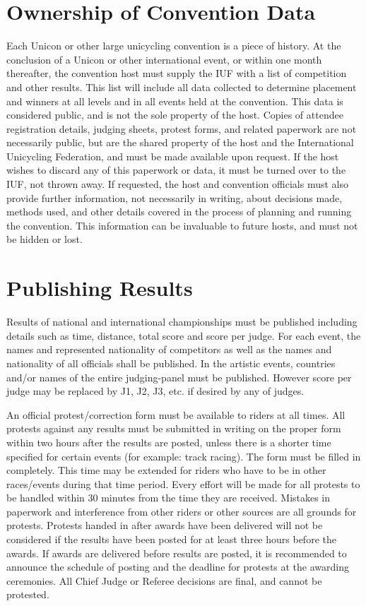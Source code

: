 \section{Ownership of Convention Data}
Each Unicon or other large unicycling convention is a piece of history.
At the conclusion of a Unicon or other international event, or within one month thereafter, the convention host must supply the IUF with a list of competition and other results.
This list will include all data collected to determine placement and winners at all levels and in all events held at the convention.
This data is considered public, and is not the sole property of the host.
Copies of attendee registration details, judging sheets, protest forms, and related paperwork are not necessarily public, but are the shared property of the host and the International Unicycling Federation, and must be made available upon request.
If the host wishes to discard any of this paperwork or data, it must be turned over to the IUF, not thrown away.
If requested, the host and convention officials must also provide further information, not necessarily in writing, about decisions made, methods used, and other details covered in the process of planning and running the convention.
This information can be invaluable to future hosts, and must not be hidden or lost.

\section{Publishing Results}
Results of national and international championships must be published including details such as time, distance, total score and score per judge.
For each event, the names and represented nationality of competitors as well as the names and nationality of all officials shall be published.
In the artistic events, countries and/or names of the entire judging-panel must be published.
However score per judge may be replaced by J1, J2, J3, etc.
if desired by any of judges.

An official protest/correction form must be available to riders at all times.
All protests against any results must be submitted in writing on the proper form within two hours after the results are posted, unless there is a shorter time specified for certain events (for example: track racing).
The form must be filled in completely.
This time may be extended for riders who have to be in other races/events during that time period.
Every effort will be made for all protests to be handled within 30 minutes from the time they are received.
Mistakes in paperwork and interference from other riders or other sources are all grounds for protests.
Protests handed in after awards have been delivered will not be considered if the results have been posted for at least three hours before the awards.
If awards are delivered before results are posted, it is recommended to announce the schedule of posting and the deadline for protests at the awarding ceremonies.
All Chief Judge or Referee decisions are final, and cannot be protested.

